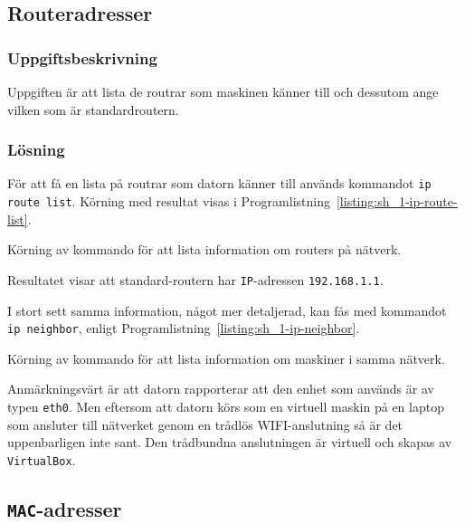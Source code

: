 \subsection{Routeradresser}
\subsubsection{Uppgiftsbeskrivning}
Uppgiften är att lista de routrar som maskinen känner till och dessutom ange
vilken som är standardroutern.


\subsubsection{Lösning}
För att få en lista på routrar som datorn känner till används kommandot
\texttt{ip route list}.  Körning med resultat visas i
Programlistning~\ref{listing:sh_1-ip-route-list}.

\begin{listing}[H]
  \caption{Körning av kommando för att lista information om routers på
           nätverk.}
  \label{listing:sh_1-ip-route-list}
\end{listing}


Resultatet visar att standard-routern har \texttt{IP}-adressen
\texttt{192.168.1.1}.


I stort sett samma information, något mer detaljerad, kan fås med kommandot
\texttt{ip neighbor}, enligt Programlistning~\ref{listing:sh_1-ip-neighbor}.

\begin{listing}[H]
  \caption{Körning av kommando för att lista information om maskiner i samma
           nätverk.}
  \label{listing:sh_1-ip-neighbor}
\end{listing}

Anmärkningsvärt är att datorn rapporterar att den enhet som används är av typen
\texttt{eth0}.  Men eftersom att datorn körs som en virtuell maskin på en
laptop som ansluter till nätverket genom en trådlös WIFI-anslutning så är det
uppenbarligen inte sant.  Den trådbundna anslutningen är virtuell och skapas av
\texttt{VirtualBox}.



\subsection{\texttt{MAC}-adresser}
